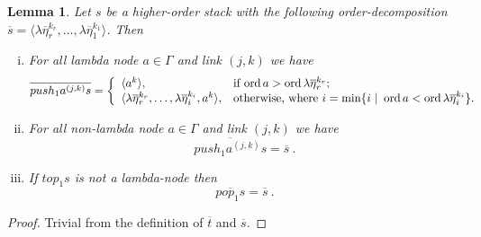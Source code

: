 \documentclass{article}
\newcommand{\ord}{\mathop{\mathrm{ord}}}
\newtheorem{lemma}{Lemma}[section]
\theoremstyle{remark}
\theoremstyle{definition}
\newcommand\orddec\overline
\begin{document}
\begin{lemma}
\label{lem:push1pop1_orderdecompo} Let $s$ be a higher-order stack
with the following order-decomposition $\orddec{s} = \langle \lambda
\overline{\eta}_r^{k_r}, \ldots, \lambda \overline{\eta}_1^{k_1}
\rangle$. Then
\begin{enumerate}[i.]
\item For all lambda node $a \in \Gamma$ and link $(j,k)$ we have
 $$ \orddec{push_1 a^{(j,k)} s} = \left\{
                                       \begin{array}{ll}
                                        \langle a^k \rangle, &  \hbox{if $\ord{a} > \ord{\lambda \overline{\eta}_r^{k_r}}$}; \\
                                         \langle \lambda \overline{\eta}_r^{k_r}, \ldots, \lambda
\overline{\eta}_i^{k_i}, a^k \rangle, & \hbox{otherwise, where $i = \min \{ i \ | \ \ord{a} <
\ord{\lambda \overline{\eta}_i^{k_i}} \}$.}
                                       \end{array}
                                     \right.$$

\item For all non-lambda node $a \in \Gamma$ and link $(j,k)$ we have
$$ \orddec{push_1 a^{(j,k)} s} = \orddec{s} \ .$$

\item If $top_1 s$ is not a lambda-node then
$$ \orddec{pop_1 s} = \orddec{s} \ .$$
\end{enumerate}
\end{lemma}
\begin{proof}
  Trivial from the definition of $\orddec{t}$ and
  $\orddec{s}$.
\end{proof}
\end{document}
